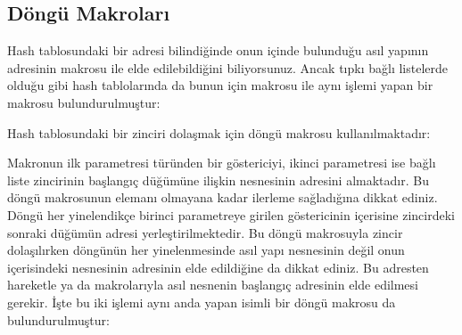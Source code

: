 \documentclass[a4paper,10pt,turkish]{sphinxmanual}
\begin{document}
\subsection{Döngü Makroları}
\label{\detokenize{kernellinkedlistandhashtable:dongu-makrolari}}
\sphinxAtStartPar
Hash tablosundaki bir  adresi bilindiğinde onun içinde bulunduğu asıl yapının
adresinin  makrosu ile elde edilebildiğini biliyorsunuz. Ancak tıpkı bağlı
listelerde olduğu gibi hash tablolarında da bunun için  makrosu ile aynı
işlemi yapan bir  makrosu bulundurulmuştur:

\begin{sphinxVerbatim}[commandchars=\\\{\}]
\end{sphinxVerbatim}

\sphinxAtStartPar
Hash tablosundaki bir zinciri dolaşmak için  döngü makrosu
kullanılmaktadır:

\begin{sphinxVerbatim}[commandchars=\\\{\}]
\end{sphinxVerbatim}

\sphinxAtStartPar
Makronun ilk parametresi  türünden bir göstericiyi, ikinci parametresi ise
bağlı liste zincirinin başlangıç düğümüne ilişkin  nesnesinin adresini
almaktadır. Bu döngü makrosunun  elemanı  olmayana kadar ilerleme
sağladığına dikkat ediniz. Döngü her yinelendikçe birinci parametreye girilen göstericinin
içerisine zincirdeki sonraki düğümün adresi yerleştirilmektedir. Bu döngü makrosuyla zincir
dolaşılırken döngünün her yinelenmesinde asıl yapı nesnesinin değil onun içerisindeki
 nesnesinin adresinin elde edildiğine da dikkat ediniz. Bu adresten hareketle
 ya da  makrolarıyla asıl nesnenin başlangıç adresinin elde
edilmesi gerekir. İşte bu iki işlemi aynı anda yapan  isimli bir
döngü makrosu da bulundurulmuştur:
\end{document}

